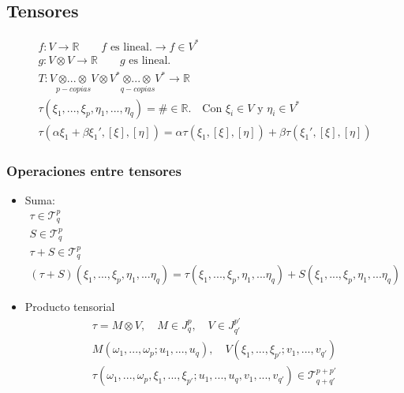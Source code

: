 \documentclass{article}
\begin{document}
\subsection{Tensores }
\begin{gather*}
  f: V \rightarrow \mathbb{R}\qquad f \text{ es lineal.} \rightarrow f\in V ^ {* }\\
  g: V \otimes V \rightarrow \mathbb{R} \qquad g \text{ es lineal.}\\
  T: V \underset{p-copias}{\otimes ... \otimes} V \otimes V^*\underset{q-copias}{\otimes ... \otimes} V^* \rightarrow \mathbb{R}\\
  \tau(\xi_1, ..., \xi_p, \eta_1, ..., \eta_q ) = \# \in \mathbb{R}. \quad \text{Con }\xi _i \in V \text{ y } \eta_i \in V^*\\
  \tau(\alpha \xi_1 + \beta \xi_1', [\xi],[\eta]) = \alpha \tau(\xi_1 , [\xi],[\eta]) + \beta \tau(\xi_1', [\xi],[\eta])
\end{gather*}

\subsubsection{Operaciones entre tensores }
\begin{itemize}
  \item Suma: 
    \begin{gather*}
      \tau \in \mathcal{T}_q^p \\
      S\in \mathcal{T} _q^p\\
      \tau + S \in \mathcal{T}_q^p \\
      (\tau + S)(\xi_1,...,\xi_p,\eta_1,...\eta_q) = \tau(\xi_1,...,\xi_p,\eta_1,...\eta_q) + S(\xi_1,...,\xi_p,\eta_1,...\eta_q)
    \end{gather*}
  \item Producto tensorial
    \begin{gather*}
      \tau = M \otimes V, \quad M \in J ^p_q , \quad V\in J ^ {p' }_{q' } \\
      M(\omega_1,...,\omega_p ; u_1,...,u_q), \quad V(\xi_1,...,\xi _{p' } ; v_1,...,v _{q'} )\\
      \tau(\omega_1,...,\omega_p,\xi_1,...,\xi _{p' } ; u_1,...,u_q,v_1,...,v _{q'} ) \in \mathcal{T} _{q+q' } ^ {p+ p' }
    \end{gather*}
\end{itemize}
\end{document}
